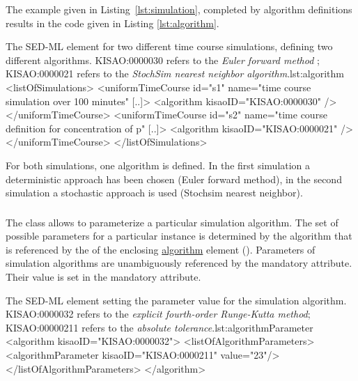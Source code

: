 The example given in Listing~\ref{lst:simulation}, completed by algorithm definitions results in the code given in Listing \ref{lst:algorithm}.

\begin{myXmlLst}{The SED-ML  element for two different time course simulations, defining two different algorithms. KISAO:0000030 refers to the \emph{Euler forward method} ; KISAO:0000021 refers to the \emph{StochSim nearest neighbor algorithm}.}{lst:algorithm}
<listOfSimulations>
	<uniformTimeCourse id="s1" name="time course simulation over 100 minutes" [..]>
		<algorithm kisaoID="KISAO:0000030" />
	</uniformTimeCourse>
	<uniformTimeCourse id="s2" name="time course definition for concentration of p" [..]>
		<algorithm kisaoID="KISAO:0000021" />
	</uniformTimeCourse>
</listOfSimulations>
\end{myXmlLst}

For both simulations, one algorithm is defined. In the first simulation  a deterministic approach has been chosen (Euler forward method), in the second simulation  a stochastic approach is used (Stochsim nearest neighbor).


\subsubsection{}
\label{class:algorithmParameter}
The  class allows to parameterize a particular simulation algorithm. The set of possible parameters for a particular instance is determined by the algorithm that is referenced by the  of the enclosing \hyperref[class:algorithm]{algorithm} element (). Parameters of simulation algorithms are unambiguously referenced by the mandatory  attribute. Their value is set in the mandatory  attribute.

\begin{myXmlLst}{The SED-ML  element setting the parameter value for the simulation algorithm. KISAO:0000032 refers to the \emph{explicit fourth-order Runge-Kutta method}; KISAO:00000211 refers to the \emph{absolute tolerance}.}{lst:algorithmParameter}
<algorithm kisaoID="KISAO:0000032"> 
	<listOfAlgorithmParameters> 
		<algorithmParameter kisaoID="KISAO:0000211" value="23"/> 
	</listOfAlgorithmParameters> 
</algorithm>
\end{myXmlLst}


